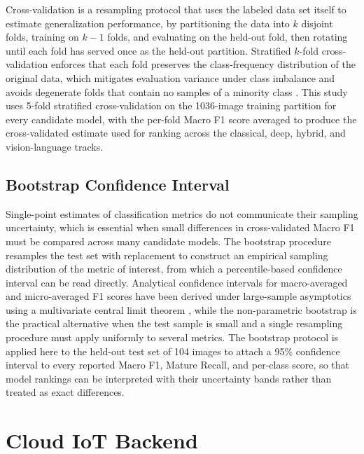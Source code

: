 Cross-validation is a resampling protocol that uses the labeled data set itself to estimate generalization performance, by partitioning the data into $k$ disjoint folds, training on $k-1$ folds, and evaluating on the held-out fold, then rotating until each fold has served once as the held-out partition. Stratified $k$-fold cross-validation enforces that each fold preserves the class-frequency distribution of the original data, which mitigates evaluation variance under class imbalance and avoids degenerate folds that contain no samples of a minority class \cite{szeghalmy2023stratifiedcv}. This study uses 5-fold stratified cross-validation on the 1036-image training partition for every candidate model, with the per-fold Macro F1 score averaged to produce the cross-validated estimate used for ranking across the classical, deep, hybrid, and vision-language tracks.

\subsection{Bootstrap Confidence Interval}

Single-point estimates of classification metrics do not communicate their sampling uncertainty, which is essential when small differences in cross-validated Macro F1 must be compared across many candidate models. The bootstrap procedure resamples the test set with replacement to construct an empirical sampling distribution of the metric of interest, from which a percentile-based confidence interval can be read directly. Analytical confidence intervals for macro-averaged and micro-averaged F1 scores have been derived under large-sample asymptotics using a multivariate central limit theorem \cite{takahashi2022f1ci}, while the non-parametric bootstrap is the practical alternative when the test sample is small and a single resampling procedure must apply uniformly to several metrics. The bootstrap protocol is applied here to the held-out test set of 104 images to attach a 95\% confidence interval to every reported Macro F1, Mature Recall, and per-class score, so that model rankings can be interpreted with their uncertainty bands rather than treated as exact differences.

\section{Cloud IoT Backend}

